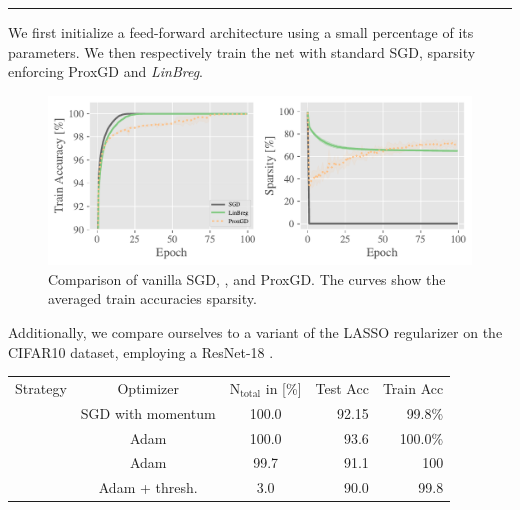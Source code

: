 \newlength\bottomstripheight%
\setlength{\bottomstripheight}{.25\textheight}%
%
\begin{minipage}[t]{\textwidth}%
\vskip0pt%
\textcolor{BaseColor}{%
\rule{\textwidth}{.2mm}%
}\hfill%
%
%
\begin{minipage}[b][\bottomstripheight][b]{.48\textwidth}%
%
%
\small%
We first initialize a feed-forward architecture using a small percentage of its parameters. We then respectively train the net with standard SGD, sparsity enforcing ProxGD and \emph{LinBreg}.
\begin{figure}
\begin{minipage}{.7\textwidth}%
\includegraphics[width=\textwidth, trim= 0cm 0cm 0cm 0cm,clip]{atelier/SGDvsBreg_small.pdf}
\end{minipage}%
\begin{minipage}{.3\textwidth}%
\caption{\small Comparison of vanilla SGD, \LinBreg{}, and ProxGD.
The curves show the averaged train accuracies sparsity.}
\end{minipage}%
\end{figure}%
%
%
%
Additionally, we compare ourselves to a variant of the LASSO \cite{??} regularizer on the CIFAR10 \cite{Krizhevsky09} dataset, employing a ResNet-18 \cite{he2015delving}.
%
%
%
\begin{table}[htb]
\scriptsize
\begin{minipage}{.69\textwidth}%
\begin{tabularx}{\textwidth}{|c||c c|R R|}
Strategy & Optimizer & 
$\mathrm{N}_{\mathrm{total}}$ in [\%] & 
Test Acc&Train Acc\\
\hhline{|=====|}
&SGD with momentum &100.0&92.15&99.8\%\\
&Adam &100.0&93.6&100.0\%\\
\hhline{-----}
        &Adam &99.7&91.1 &100\\
        &Adam + thresh.&3.0&90.0 &99.8\\

\end{tabularx}
\end{minipage}
\end{table}
\end{minipage}
\end{minipage}
